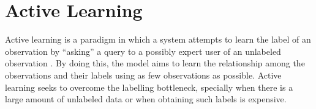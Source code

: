 \section{Active Learning} \label{sect:theory:active-learning}

Active learning is a paradigm in which a system attempts to learn the label of an observation by ``asking'' a query to a possibly expert user of an unlabeled observation \cite{report:active-learning}. By doing this, the model aims to learn the relationship among the observations and their labels using as few observations as possible. Active learning seeks to overcome the labelling bottleneck, specially when there is a large amount of unlabeled data or when obtaining such labels is expensive.
